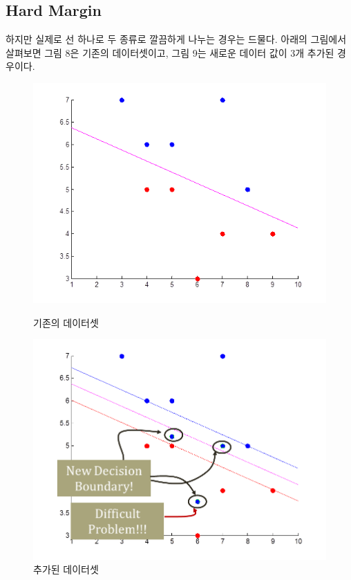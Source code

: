\documentclass[a4paper]{oblivoir}
\begin{document}
\subsection{Hard Margin}
\indent 하지만 실제로 선 하나로 두 종류로 깔끔하게 나누는 경우는 드물다. 아래의 그림에서 살펴보면 그림 8은 기존의 데이터셋이고, 그림 9는 새로운 데이터 값이 3개 추가된 경우이다.\\
\begin{figure}[ht]\centering
\parbox[t]{5cm}{\includegraphics[scale=0.4]{HardMargin1}\caption{기존의 데이터셋}\label{Fig:5-8}}\hspace{0.5cm}
\parbox[t]{5cm}{\includegraphics[scale=0.35]{HardMargin2}\caption{추가된 데이터셋}\label{Fig:5-9}}
\end{figure}\\
\end{document}
